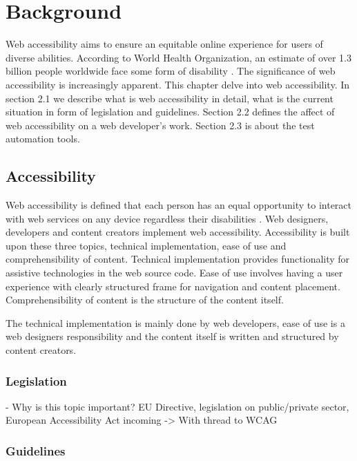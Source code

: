 \chapter{Background\label{background}}

Web accessibility aims to ensure an equitable online experience for users of diverse abilities. According to World Health Organization, an estimate of over 1.3 billion people worldwide face some form of disability \citep{whodisability}. The significance of web accessibility is increasingly apparent. This chapter delve into web accessibility. In section 2.1 we describe what is web accessibility in detail, what is the current situation in form of legislation and guidelines. Section 2.2 defines the affect of web accessibility on a web developer's work. Section 2.3 is about the test automation tools.

\section{Accessibility}

Web accessibility is defined that each person has an equal opportunity to interact with web services on any device regardless their disabilities \citep{webaccessibilitydefinition}. Web designers, developers and content creators implement web accessibility. Accessibility is built upon these three topics, technical implementation, ease of use and comprehensibility of content. Technical implementation provides functionality for assistive technologies in the web source code. Ease of use involves having a user experience with clearly structured frame for navigation and content placement. Comprehensibility of content is the structure of the content itself. 

The technical implementation is mainly done by web developers, ease of use is a web designers responsibility and the content itself is written and structured by content creators. 


\subsection{Legislation}

- Why is this topic important? EU Directive, legislation on public/private sector, European Accessibility Act incoming -> With thread to WCAG

\subsection{Guidelines}

